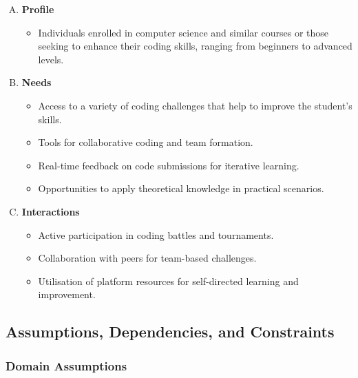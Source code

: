 \begin{enumerate}[A.]
    \item \textbf{Profile}

        \begin{itemize}
            \item Individuals enrolled in computer science and similar courses or those seeking to enhance their coding skills, ranging from beginners to advanced levels.
        \end{itemize}

    \item \textbf{Needs}

        \begin{itemize}
            \item Access to a variety of coding challenges that help to improve the student's skills.
            \item Tools for collaborative coding and team formation.
            \item Real-time feedback on code submissions for iterative learning.
            \item Opportunities to apply theoretical knowledge in practical scenarios.
        \end{itemize}

    \item \textbf{Interactions}

        \begin{itemize}
            \item Active participation in coding battles and tournaments.
            \item Collaboration with peers for team-based challenges.
            \item Utilisation of platform resources for self-directed learning and improvement.
        \end{itemize}
    
\end{enumerate}


\newpage
\subsection{Assumptions, Dependencies, and Constraints}

\subsubsection{Domain Assumptions}

